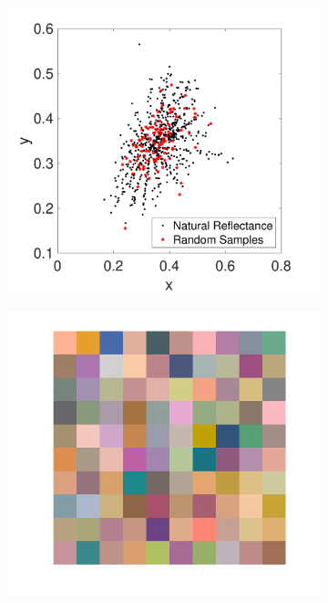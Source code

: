 \documentclass{jov}
\begin{document}
\begin{figure}
\begin{subfigure}{0.24 \textwidth}
        \label{fig:reflectanceSamples}
    \end{subfigure}
    \begin{subfigure}{0.24 \textwidth}
    \centering
    \caption{}
        \includegraphics[width=\textwidth]{../Figures/Figure7/Figure7_c.pdf}
        \label{fig:xyChroReflectance}
    \end{subfigure}    
    \centering
	\begin{subfigure}{0.24 \textwidth}
    \centering
        \caption{}
        \includegraphics[width=\textwidth]{../Figures/Figure7/Figure7_d.pdf}

\end{subfigure}
\end{figure}
\end{document}
